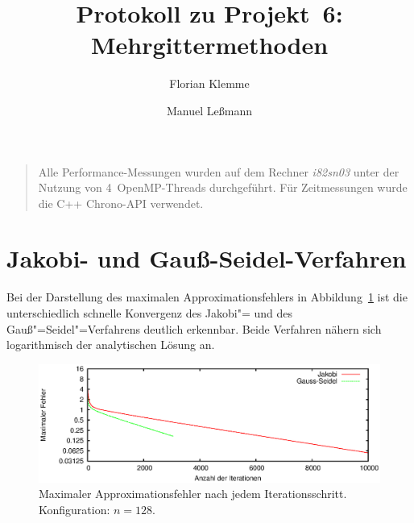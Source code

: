 \documentclass[paper = a4]{scrartcl}
\begin{document}
\subject{Praktikum Multicore"=Programmierung}
\title{Protokoll zu Projekt~6: Mehrgittermethoden}
\author{Florian Klemme \and Manuel Leßmann}
\maketitle

\begin{quote}
Alle Performance-Messungen wurden auf dem Rechner \emph{i82sn03} unter der Nutzung von 4~OpenMP-Threads durchgeführt. Für Zeitmessungen wurde die C++ Chrono-API verwendet.
\end{quote}

\section{Jakobi- und Gauß-Seidel-Verfahren}

Bei der Darstellung des maximalen Approximationsfehlers in Abbildung~\ref{fig:fehler} ist die unterschiedlich schnelle Konvergenz des Jakobi"= und des Gauß"=Seidel"=Verfahrens deutlich erkennbar. Beide Verfahren nähern sich logarithmisch der analytischen Lösung an.

\begin{figure}
    \centering
    \includegraphics[width=\textwidth]{plots/fehlerprot}
    \caption{Maximaler Approximationsfehler nach jedem Iterationsschritt. Konfiguration: \(n = 128\).}
    \label{fig:fehler}
\end{figure}
\end{document}
